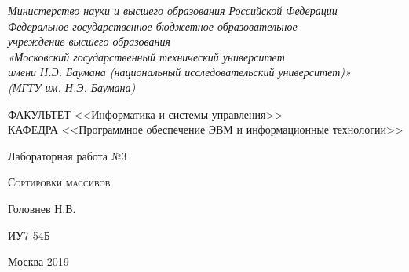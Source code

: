 \documentclass[a4paper,12pt]{article}
\begin{document}

\begin{titlepage}
\newpage

\begin{center}

\textit{Министерство науки и высшего образования Российской Федерации \\ 
Федеральное государственное бюджетное образовательное \\
учреждение высшего образования \\
«Московский государственный технический университет \\
имени Н.Э. Баумана (национальный исследовательский университет)» \\
(МГТУ им. Н.Э. Баумана) \\}
\hrulefill
\end{center}

\vspace{2em}

\begin{flushleft}
ФАКУЛЬТЕТ <<Информатика и системы управления>> \\
\vspace{0.5em}
КАФЕДРА <<Программное обеспечение ЭВМ и информационные технологии>>
\end{flushleft}


\vspace{8em}

\begin{center}
\LARGE Лабораторная работа №3 \\
\end{center}

\vspace{1.5em}

\begin{center}
\textsc{Сортировки массивов}
\end{center}

\vspace{6em}

\begin{center}
Головнев Н.В.

\vspace{4em}

ИУ7-54Б
\end{center}

\vspace{\fill}

\begin{center}
Москва 2019
\end{center}

\end{titlepage}
\end{document}
